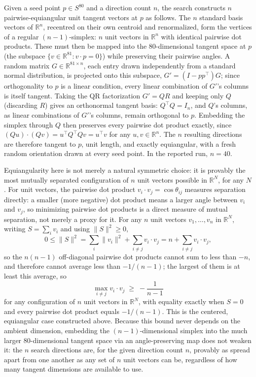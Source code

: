 \documentclass[11pt]{article}
\begin{document}
Given a seed point $p \in S^{80}$ and a direction count $n$, the search
constructs $n$ pairwise-equiangular unit tangent vectors at $p$ as follows.
The $n$ standard basis vectors of $\mathbb{R}^n$, recentred on their own
centroid and renormalized, form the vertices of a regular $(n-1)$-simplex:
$n$ unit vectors in $\mathbb{R}^n$ with identical pairwise dot products.
These must then be mapped into the 80-dimensional tangent space at $p$
(the subspace $\{v \in \mathbb{R}^{81} : v \cdot p = 0\}$) while preserving
their pairwise angles. A random matrix $G \in \mathbb{R}^{81 \times n}$,
each entry drawn independently from a standard normal distribution, is
projected onto this subspace, $G' = (I - pp^\top)G$;
since orthogonality to $p$ is a linear condition, every linear combination
of $G'$'s columns is itself tangent. Taking the QR factorization $G' = QR$
and keeping only $Q$ (discarding $R$) gives an orthonormal tangent basis:
$Q^\top Q = I_n$, and $Q$'s columns, as linear combinations of $G'$'s
columns, remain orthogonal to $p$. Embedding the simplex through $Q$ then
preserves every pairwise dot product exactly, since $(Qu)\cdot(Qv) =
u^\top Q^\top Q v = u^\top v$ for any $u, v \in \mathbb{R}^n$. The $n$
resulting directions are therefore tangent to $p$, unit length, and exactly
equiangular, with a fresh random orientation drawn at every seed point. In
the reported run, $n = 40$.

Equiangularity here is not merely a natural symmetric choice: it is
provably the most mutually separated configuration of $n$ unit vectors
possible in $\mathbb{R}^N$, for any $N$. For unit vectors, the pairwise dot
product $v_i \cdot v_j = \cos\theta_{ij}$ measures separation directly: a
smaller (more negative) dot product means a larger angle between $v_i$ and
$v_j$, so minimizing pairwise dot products is a direct measure of mutual
separation, not merely a proxy for it. For any $n$
unit vectors $v_1, \dots, v_n$ in $\mathbb{R}^N$,
writing $S = \sum\limits_{i} v_i$ and using $\|S\|^2 \geq 0$,
\[
0 \leq \|S\|^2 = \sum_i \|v_i\|^2 + \sum_{i \neq j} v_i \cdot v_j
= n + \sum_{i \neq j} v_i \cdot v_j,
\]
so the $n(n-1)$ off-diagonal pairwise dot products cannot sum to less than
$-n$, and therefore cannot average less than $-1/(n-1)$; the largest of
them is at least this average, so
\[
\max_{i \neq j} v_i \cdot v_j \;\geq\; -\frac{1}{n-1}
\]
for any configuration of $n$ unit vectors in $\mathbb{R}^N$, with
equality exactly when $S = 0$ and every pairwise dot product equals
$-1/(n-1)$. This is the centered, equiangular case constructed above. Because
this bound never depends on the ambient dimension, embedding the
$(n-1)$-dimensional simplex into the much larger 80-dimensional tangent
space via an angle-preserving map does not weaken it: the $n$ search
directions are, for the given direction count $n$, provably as spread
apart from one another as any set of $n$ unit vectors can be, regardless
of how many tangent dimensions are available to use.
\end{document}
